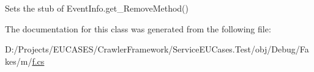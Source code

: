 Sets the stub of Event\-Info.\-get\-\_\-\-Remove\-Method()



The documentation for this class was generated from the following file\-:\begin{DoxyCompactItemize}
\item 
D\-:/\-Projects/\-E\-U\-C\-A\-S\-E\-S/\-Crawler\-Framework/\-Service\-E\-U\-Cases.\-Test/obj/\-Debug/\-Fakes/m/\hyperlink{m_2f_8cs}{f.\-cs}\end{DoxyCompactItemize}
